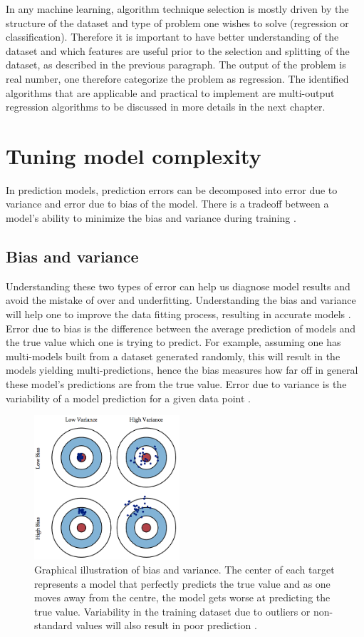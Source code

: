 In any machine learning, algorithm technique selection is mostly driven by the structure of the dataset and type of problem one wishes to solve (regression or classification). Therefore it is important to have better understanding of the dataset and which features are useful prior to the selection and splitting of the dataset, as described in the previous paragraph. The output of the problem is real number, one therefore categorize the problem as regression. The identified algorithms that are applicable and practical to implement are multi-output regression algorithms to be discussed in more details in the next chapter. 


\section{Tuning model complexity}
\label{comp}
In prediction models, prediction errors can be decomposed into error due to variance and error due to bias of the model. There is a tradeoff between a model's ability to minimize the bias and variance during training \citep{fortmann2012understanding}. 
\subsection{Bias and variance }
Understanding these two types of error can help us diagnose model results and avoid the mistake of over and underfitting. Understanding the bias and variance will help one to improve the data fitting process, resulting in accurate models \citep{fortmann2012understanding}.
Error due to bias is the difference between the average prediction of  models and the true value which one is trying to predict. For example, assuming one has multi-models built from a dataset generated randomly, this will result in the models yielding multi-predictions, hence the bias measures how far off in general these model's predictions are from the true value. Error due to variance is the variability of a model prediction for a given data point \citep{fortmann2012understanding}. 

\begin{figure}[H]
  \centering
    \includegraphics[width=0.48\textwidth]{images/Bias.png}
    \caption{Graphical illustration of bias and variance. The center of each target represents a model that perfectly predicts the true value and as one moves away from the centre, the model gets worse at predicting the true value. Variability in the training dataset due to outliers or non-standard values will also result in poor prediction \citep{fortmann2012understanding}.}
  \label{RC}
 \end{figure}
 
